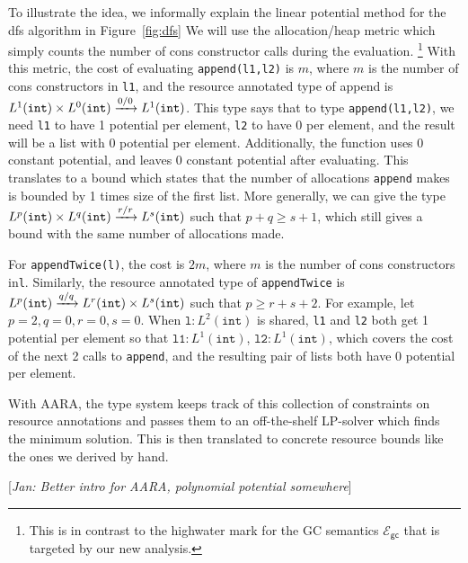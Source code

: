 \documentclass{easychair}
\newcommand{\ms}[1]{\ensuremath{\mathsf{#1}}}
\newcommand{\irl}[1]{\mathtt{#1}}
\newcommand{\jan}[1]{{\color{red} [\emph{Jan: #1}]}}
\newcommand{\gcSem}{\ensuremath{\mathcal{E}_{\ms{gc}}}}
\theoremstyle{definition}
\begin{document}
To illustrate the idea, we informally explain the linear potential method for the dfs algorithm in Figure~\ref{fig:dfs}
We will use the allocation/heap metric which simply counts the number of cons constructor calls during the evaluation.%
\footnote{This is in contrast to the highwater mark for the GC semantics \gcSem{} that is targeted by our new analysis.}
With this metric, the cost of evaluating \texttt{append(l1,l2)} is $m$, where $m$ is the number 
of cons constructors in \texttt{l1}, and the resource annotated type of append is 
$\prodtycst{L^1(\irl{int})}{L^0(\irl{int})} \xrightarrow{0/0} L^1(\irl{int})$.
This type says that to type \texttt{append(l1,l2)}, we need \texttt{l1} 
to have 1 potential per element, \texttt{l2} to have 0 per element, and the result 
will be a list with 0 potential per element.
Additionally, the function uses 0 constant potential, and 
leaves 0 constant potential after evaluating. This translates to a bound which states that 
the number of allocations \texttt{append} makes is bounded by 1 times size of the first list.
More generally, we can give the type 
$\prodtycst{L^p(\irl{int})}{L^q(\irl{int})} \xrightarrow{r/r} L^s(\irl{int})$ such that
$p + q \ge s + 1$, which still gives a bound with the same number of allocations made. 

For \texttt{appendTwice(l)}, the cost is $2m$, where $m$ is the number of cons 
constructors in\texttt{l}. Similarly, the resource annotated type of \texttt{appendTwice} is
$L^p(\irl{int}) \xrightarrow{q/q} \prodtycst{L^r(\irl{int})}{L^s(\irl{int})}$ 
such that $p \ge r + s + 2$. For example, let
$p = 2, q = 0, r= 0, s =0$. When $\texttt{l} : L^2(\irl{int})$ is shared, \texttt{l1} and 
\texttt{l2} both get 1 potential per element so that $\texttt{l1} : L^1(\irl{int})$,
$\texttt{l2} : L^1(\irl{int})$, which covers the cost of the next 2 calls to \texttt{append}, 
and the resulting pair of lists both have 0 potential per element.

With AARA, the type system keeps track of this collection of constraints on
resource annotations and passes them to an off-the-shelf LP-solver 
which finds the minimum solution. This is then translated to concrete resource bounds
like the ones we derived by hand.
%

\jan{Better intro for AARA, polynomial potential somewhere}
\end{document}
